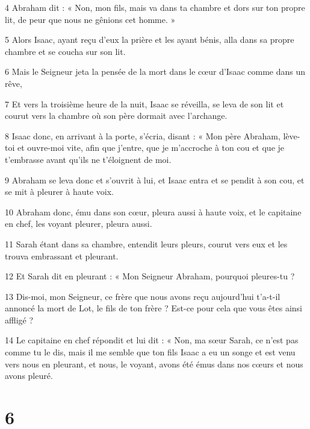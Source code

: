 \par 4 Abraham dit : « Non, mon fils, mais va dans ta chambre et dors sur ton propre lit, de peur que nous ne gênions cet homme. »

\par 5 Alors Isaac, ayant reçu d'eux la prière et les ayant bénis, alla dans sa propre chambre et se coucha sur son lit.

\par 6 Mais le Seigneur jeta la pensée de la mort dans le cœur d'Isaac comme dans un rêve,

\par 7 Et vers la troisième heure de la nuit, Isaac se réveilla, se leva de son lit et courut vers la chambre où son père dormait avec l'archange.

\par 8 Isaac donc, en arrivant à la porte, s'écria, disant : « Mon père Abraham, lève-toi et ouvre-moi vite, afin que j'entre, que je m'accroche à ton cou et que je t'embrasse avant qu'ils ne t'éloignent de moi.

\par 9 Abraham se leva donc et s'ouvrit à lui, et Isaac entra et se pendit à son cou, et se mit à pleurer à haute voix.

\par 10 Abraham donc, ému dans son cœur, pleura aussi à haute voix, et le capitaine en chef, les voyant pleurer, pleura aussi.

\par 11 Sarah étant dans sa chambre, entendit leurs pleurs, courut vers eux et les trouva embrassant et pleurant.

\par 12 Et Sarah dit en pleurant : « Mon Seigneur Abraham, pourquoi pleures-tu ?

\par 13 Dis-moi, mon Seigneur, ce frère que nous avons reçu aujourd'hui t'a-t-il annoncé la mort de Lot, le fils de ton frère ? Est-ce pour cela que vous êtes ainsi affligé ?

\par 14 Le capitaine en chef répondit et lui dit : « Non, ma sœur Sarah, ce n'est pas comme tu le dis, mais il me semble que ton fils Isaac a eu un songe et est venu vers nous en pleurant, et nous, le voyant, avons été émus dans nos cœurs et nous avons pleuré.

\chapter{6}

